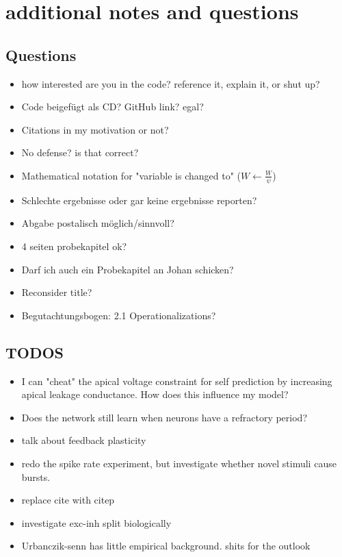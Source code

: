 \chapter{additional notes and questions}

\section{Questions}


\begin{itemize}
    \item how interested are you in the code? reference it, explain it, or shut up?
    \item Code beigefügt als CD? GitHub link? egal?
    \item Citations in my motivation or not?
    \item No defense? is that correct?
    \item Mathematical notation for "variable is changed to" ($W \leftarrow \frac{W}{\psi}$)
    \item Schlechte ergebnisse oder gar keine ergebnisse reporten?
    \item Abgabe postalisch möglich/sinnvoll?
    \item 4 seiten probekapitel ok?
    \item Darf ich auch ein Probekapitel an Johan schicken?
    \item Reconsider title?
    \item Begutachtungsbogen: 2.1 Operationalizations?
\end{itemize}


\section{TODOS}

\begin{itemize}
    \item I can "cheat" the apical voltage constraint for self prediction by increasing apical leakage conductance. How
    does this influence my model?
    \item Does the network still learn when neurons have a refractory period?
    \item talk about feedback plasticity
    \item redo the spike rate experiment, but investigate whether novel stimuli cause bursts.
    \item replace cite with citep
    \item investigate exc-inh split biologically
    \item Urbanczik-senn has little empirical background. shits for the outlook
\end{itemize}

